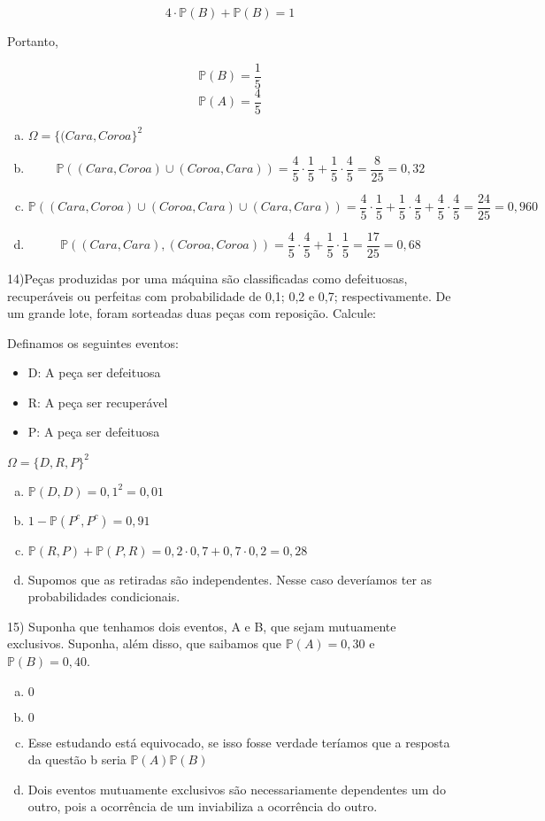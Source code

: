 \documentclass{article}
\begin{document}
$$4 \cdot \mathds{P}(B) + \mathds{P}(B) = 1$$

Portanto, 

$$\mathds{P}(B) = \dfrac{1}{5}$$
$$\mathds{P}(A) = \dfrac{4}{5}$$

\begin{enumerate}[a)] %
    \item $\Omega = \{(Cara, Coroa\}^2$
    \item $$\mathds{P}((Cara, Coroa) \cup (Coroa, Cara)) = \dfrac{4}{5}\cdot \dfrac{1}{5} + \dfrac{1}{5}\cdot\dfrac{4}{5} = \dfrac{8}{25} = 0,32$$
    \item $$\mathds{P}((Cara, Coroa) \cup (Coroa, Cara) \cup (Cara, Cara)) = \dfrac{4}{5}\cdot \dfrac{1}{5} + \dfrac{1}{5}\cdot\dfrac{4}{5} + \dfrac{4}{5}\cdot \dfrac{4}{5} = \dfrac{24}{25} = 0,960$$
    \item $$\mathds{P}((Cara, Cara), (Coroa, Coroa)) =\dfrac{4}{5} \cdot \dfrac{4}{5} + \dfrac{1}{5} \cdot \dfrac{1}{5} = \dfrac{17}{25} = 0,68$$
\end{enumerate}



14)Peças produzidas por uma máquina são classificadas como defeituosas,
recuperáveis ou perfeitas com probabilidade de 0,1; 0,2 e 0,7; respectivamente.
De um grande lote, foram sorteadas duas peças com reposição. Calcule:

Definamos os seguintes eventos:

\begin{itemize}
    \item D: A peça ser defeituosa
    \item R: A peça ser recuperável
    \item P: A peça ser defeituosa
\end{itemize}

$\Omega=\{D, R, P\}^2$

\begin{enumerate}[a)] %
    \item $\mathds{P}(D,D) = 0,1^2 = 0,01$
    \item $1 - \mathds{P}(P^c, P^c)= 0,91$
    \item $\mathds{P}(R,P) + \mathds{P}(P,R) = 0,2 \cdot 0,7 + 0,7 \cdot 0,2 = 0,28$
    \item Supomos que as retiradas são independentes. Nesse caso deveríamos ter as probabilidades condicionais. 
\end{enumerate}

15) Suponha que tenhamos dois eventos, A e B, que sejam mutuamente exclusivos. Suponha, além disso, que saibamos que $\mathds{P}(A) = 0,30$ e $\mathds{P}(B) = 0,40$.

\begin{enumerate}[a)] %
    \item $0$
    \item $0$
    \item Esse estudando está equivocado, se isso fosse verdade teríamos que a resposta da questão b seria $\mathds{P}(A)\mathds{P}(B)$ 
    \item Dois eventos mutuamente exclusivos são necessariamente dependentes um do outro, pois a ocorrência de um inviabiliza a ocorrência do outro. 
\end{enumerate}
\end{document}
